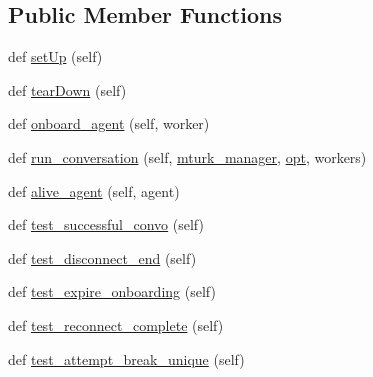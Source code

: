\subsection*{Public Member Functions}
\begin{DoxyCompactItemize}
\item 
def \hyperlink{classparlai_1_1mturk_1_1core_1_1test_1_1test__full__system_1_1TestMTurkManagerWorkflows_a62baf9564be3f57380e5ac503c1ccd3c}{set\+Up} (self)
\item 
def \hyperlink{classparlai_1_1mturk_1_1core_1_1test_1_1test__full__system_1_1TestMTurkManagerWorkflows_ac71286659999bc57bb05ff2977579800}{tear\+Down} (self)
\item 
def \hyperlink{classparlai_1_1mturk_1_1core_1_1test_1_1test__full__system_1_1TestMTurkManagerWorkflows_af9628e722f66ef40f006b2f79428c0f8}{onboard\+\_\+agent} (self, worker)
\item 
def \hyperlink{classparlai_1_1mturk_1_1core_1_1test_1_1test__full__system_1_1TestMTurkManagerWorkflows_abe32bc53e3e76d2db1bf52045fa15707}{run\+\_\+conversation} (self, \hyperlink{classparlai_1_1mturk_1_1core_1_1test_1_1test__full__system_1_1TestMTurkManagerWorkflows_a93e0d9b889cf71ac938b0c6bd0b92f56}{mturk\+\_\+manager}, \hyperlink{classparlai_1_1mturk_1_1core_1_1test_1_1test__full__system_1_1TestMTurkManagerWorkflows_af2d2b236e15533fb486ec5cc3c674622}{opt}, workers)
\item 
def \hyperlink{classparlai_1_1mturk_1_1core_1_1test_1_1test__full__system_1_1TestMTurkManagerWorkflows_af85871f2f5b5aca9ee6ffbaf627208c6}{alive\+\_\+agent} (self, agent)
\item 
def \hyperlink{classparlai_1_1mturk_1_1core_1_1test_1_1test__full__system_1_1TestMTurkManagerWorkflows_a57d2c60bcdf0e907cb6c67873d2c4b24}{test\+\_\+successful\+\_\+convo} (self)
\item 
def \hyperlink{classparlai_1_1mturk_1_1core_1_1test_1_1test__full__system_1_1TestMTurkManagerWorkflows_a8af4ec1e17ef7dc37903d839ff4882f0}{test\+\_\+disconnect\+\_\+end} (self)
\item 
def \hyperlink{classparlai_1_1mturk_1_1core_1_1test_1_1test__full__system_1_1TestMTurkManagerWorkflows_ae9266603acec90b5458980c06d971f42}{test\+\_\+expire\+\_\+onboarding} (self)
\item 
def \hyperlink{classparlai_1_1mturk_1_1core_1_1test_1_1test__full__system_1_1TestMTurkManagerWorkflows_a97548a1e73c03aafa7cef8a8076a5dd7}{test\+\_\+reconnect\+\_\+complete} (self)
\item 
def \hyperlink{classparlai_1_1mturk_1_1core_1_1test_1_1test__full__system_1_1TestMTurkManagerWorkflows_a54846533d6b063b399b5c889f2fe520b}{test\+\_\+attempt\+\_\+break\+\_\+unique} (self)

\end{DoxyCompactItemize}
